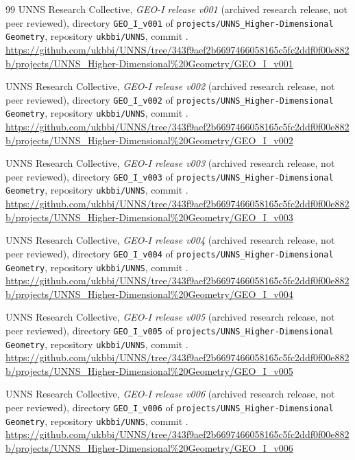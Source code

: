 \begin{thebibliography}{99}
UNNS Research Collective, \emph{GEO-I release v001} (archived research release, not peer reviewed), directory \texttt{GEO\_I\_v001} of \texttt{projects/UNNS\_Higher-Dimensional Geometry}, repository \texttt{ukbbi/UNNS}, commit \geoicommit. \url{https://github.com/ukbbi/UNNS/tree/343f9aef2b6697466058165c5fc2ddf0f00e882b/projects/UNNS_Higher-Dimensional%20Geometry/GEO_I_v001}

UNNS Research Collective, \emph{GEO-I release v002} (archived research release, not peer reviewed), directory \texttt{GEO\_I\_v002} of \texttt{projects/UNNS\_Higher-Dimensional Geometry}, repository \texttt{ukbbi/UNNS}, commit \geoicommit. \url{https://github.com/ukbbi/UNNS/tree/343f9aef2b6697466058165c5fc2ddf0f00e882b/projects/UNNS_Higher-Dimensional%20Geometry/GEO_I_v002}

UNNS Research Collective, \emph{GEO-I release v003} (archived research release, not peer reviewed), directory \texttt{GEO\_I\_v003} of \texttt{projects/UNNS\_Higher-Dimensional Geometry}, repository \texttt{ukbbi/UNNS}, commit \geoicommit. \url{https://github.com/ukbbi/UNNS/tree/343f9aef2b6697466058165c5fc2ddf0f00e882b/projects/UNNS_Higher-Dimensional%20Geometry/GEO_I_v003}

UNNS Research Collective, \emph{GEO-I release v004} (archived research release, not peer reviewed), directory \texttt{GEO\_I\_v004} of \texttt{projects/UNNS\_Higher-Dimensional Geometry}, repository \texttt{ukbbi/UNNS}, commit \geoicommit. \url{https://github.com/ukbbi/UNNS/tree/343f9aef2b6697466058165c5fc2ddf0f00e882b/projects/UNNS_Higher-Dimensional%20Geometry/GEO_I_v004}

UNNS Research Collective, \emph{GEO-I release v005} (archived research release, not peer reviewed), directory \texttt{GEO\_I\_v005} of \texttt{projects/UNNS\_Higher-Dimensional Geometry}, repository \texttt{ukbbi/UNNS}, commit \geoicommit. \url{https://github.com/ukbbi/UNNS/tree/343f9aef2b6697466058165c5fc2ddf0f00e882b/projects/UNNS_Higher-Dimensional%20Geometry/GEO_I_v005}

UNNS Research Collective, \emph{GEO-I release v006} (archived research release, not peer reviewed), directory \texttt{GEO\_I\_v006} of \texttt{projects/UNNS\_Higher-Dimensional Geometry}, repository \texttt{ukbbi/UNNS}, commit \geoicommit. \url{https://github.com/ukbbi/UNNS/tree/343f9aef2b6697466058165c5fc2ddf0f00e882b/projects/UNNS_Higher-Dimensional%20Geometry/GEO_I_v006}


\end{thebibliography}
